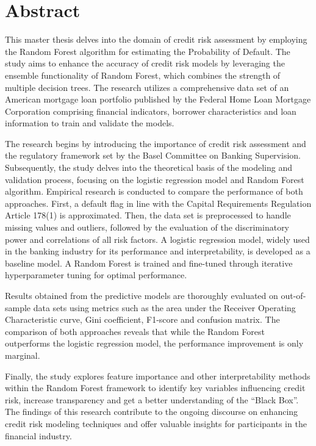 \chapter*{\centering Abstract}

\vspace{0.5cm}

This master thesis delves into the domain of credit risk assessment by employing the Random Forest algorithm for estimating the Probability of Default. The study aims to enhance the accuracy of credit risk models by leveraging the ensemble functionality of Random Forest, which combines the strength of multiple decision trees. The research utilizes a comprehensive data set of an American mortgage loan portfolio published by the Federal Home Loan Mortgage Corporation comprising financial indicators, borrower characteristics and loan information to train and validate the models.

The research begins by introducing the importance of credit risk assessment and the regulatory framework set by the Basel Committee on Banking Supervision. Subsequently, the study delves into the theoretical basis of the modeling and validation process, focusing on the logistic regression model and Random Forest algorithm. Empirical research is conducted to compare the performance of both approaches. First, a default flag in line with the Capital Requirements Regulation Article 178(1) is approximated. Then, the data set is preprocessed to handle missing values and outliers, followed by the evaluation of the discriminatory power and correlations of all risk factors. A logistic regression model, widely used in the banking industry for its performance and interpretability, is developed as a baseline model. A Random Forest is trained and fine-tuned through iterative hyperparameter tuning for optimal performance.

Results obtained from the predictive models are thoroughly evaluated on out-of-sample data sets using metrics such as the area under the Receiver Operating Characteristic curve, Gini coefficient, F1-score and confusion matrix. The comparison of both approaches reveals that while the Random Forest outperforms the logistic regression model, the performance improvement is only marginal. 

Finally, the study explores feature importance and other interpretability methods within the Random Forest framework to identify key variables influencing credit risk, increase transparency and get a better understanding of the “Black Box”. The findings of this research contribute to the ongoing discourse on enhancing credit risk modeling techniques and offer valuable insights for participants in the financial industry.